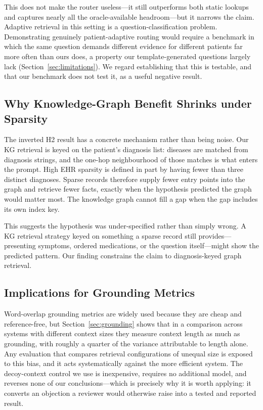 \documentclass[conference]{IEEEtran}
\begin{document}
This does not make the router useless---it still outperforms both
static lookups and captures nearly all the oracle-available
headroom---but it narrows the claim. Adaptive retrieval in this
setting is a question-classification problem. Demonstrating genuinely
patient-adaptive routing would require a benchmark in which the same
question demands different evidence for different patients far more
often than ours does, a property our template-generated questions
largely lack (Section~\ref{sec:limitations}). We regard establishing
that this is testable, and that our benchmark does not test it, as a
useful negative result.

\subsection{Why Knowledge-Graph Benefit Shrinks under Sparsity}

The inverted H2 result has a concrete mechanism rather than being
noise. Our KG retrieval is keyed on the patient's diagnosis list:
diseases are matched from diagnosis strings, and the one-hop
neighbourhood of those matches is what enters the prompt. High EHR
sparsity is defined in part by having fewer than three distinct
diagnoses. Sparse records therefore supply fewer entry points into the
graph and retrieve fewer facts, exactly when the hypothesis predicted
the graph would matter most. The knowledge graph cannot fill a gap
when the gap includes its own index key.

This suggests the hypothesis was under-specified rather than simply
wrong. A KG retrieval strategy keyed on something a sparse record still
provides---presenting symptoms, ordered medications, or the question
itself---might show the predicted pattern. Our finding constrains the
claim to diagnosis-keyed graph retrieval.

\subsection{Implications for Grounding Metrics}

Word-overlap grounding metrics are widely used because they are cheap
and reference-free, but Section~\ref{sec:grounding} shows that in a
comparison across systems with different context sizes they measure
context length as much as grounding, with roughly a quarter of the
variance attributable to length alone. Any evaluation that compares
retrieval configurations of unequal size is exposed to this bias, and
it acts systematically against the more efficient system. The
decoy-context control we use is inexpensive, requires no additional
model, and reverses none of our conclusions---which is precisely why
it is worth applying: it converts an objection a reviewer would
otherwise raise into a tested and reported result.
\end{document}
